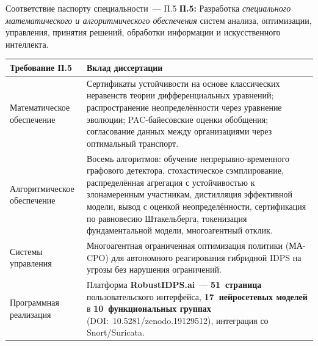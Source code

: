 \documentclass[10pt,aspectratio=169]{beamer}
\newcommand{\hl}[1]{\textcolor{accent}{\textbf{#1}}}
\begin{document}
\begin{frame}{Соответствие паспорту специальности~--- П.5}
\textbf{П.5:} Разработка \emph{специального математического и
алгоритмического обеспечения} систем анализа, оптимизации,
управления, принятия решений, обработки информации и
искусственного интеллекта.
\medskip

\footnotesize
\begin{tabular}{p{3.8cm}p{10.4cm}}
\toprule
\textbf{Требование П.5} & \textbf{Вклад диссертации} \\
\midrule
Математическое обеспечение & Сертификаты устойчивости на
основе классических неравенств теории дифференциальных
уравнений; распространение неопределённости через уравнение
эволюции; PAC-байесовские оценки обобщения; согласование
данных между организациями через оптимальный транспорт. \\
\midrule
Алгоритмическое обеспечение & Восемь алгоритмов: обучение
непрерывно-временного графового детектора, стохастическое
сэмплирование, распределённая агрегация с устойчивостью к
злонамеренным участникам, дистилляция эффективной модели,
вывод с оценкой неопределённости, сертификация по равновесию
Штакельберга, токенизация фундаментальной модели,
многоагентный отклик. \\
\midrule
Системы управления & Многоагентная ограниченная оптимизация
политики (МА-CPO) для автономного реагирования гибридной IDPS
на угрозы без нарушения ограничений. \\
\midrule
Программная реализация & Платформа \hl{RobustIDPS.ai}~---
\hl{51~страница} пользовательского интерфейса,
\hl{17~нейросетевых моделей} в \hl{10~функциональных группах}
(DOI:~10.5281/zenodo.19129512), интеграция со Snort/Suricata. \\
\bottomrule
\end{tabular}
\end{frame}
\end{document}
